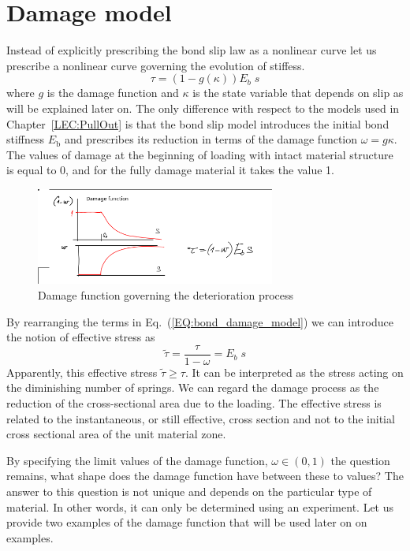\documentclass[main.tex]{subfiles}
\begin{document}
\section{Damage model}
\label{SEC:BondDamageModel}

Instead of explicitly prescribing the bond slip law as a nonlinear curve let us prescribe 
a nonlinear curve governing the evolution of stiffess.
\begin{equation}
\label{EQ:bond_damage_model}
\tau = (1 - g(\kappa))E_b \; s
\end{equation}
where $g$ is the damage function and $\kappa$ is the state variable
that depends on slip as will be explained later on. The only difference with respect to the models
used in Chapter~\ref{LEC:PullOut} is that the bond slip model introduces the 
initial bond stiffness $E_\mathrm{b}$ and prescribes its reduction in terms of the 
damage function $\omega = g{\kappa}$. The values of damage at the beginning of loading with 
intact material structure is equal to 0, and for the fully damage material it takes the value 1.
\begin{figure}[ht]
	\centering
  \includegraphics[width=0.7\textwidth]{drawings/damage_function.png}
	\caption{Damage function governing the deterioration process}
	\label{FIGSourcesOfDamageFunction}
\end{figure}
By rearranging the terms in Eq.~(\ref{EQ:bond_damage_model}) we can introduce the notion of effective stress
as 
\begin{equation}
\tilde{\tau} = \frac{\tau}{1-\omega} = E_b \; s
\end{equation}
Apparently, this effective stress $\tilde{\tau} \geq \tau$. It can be interpreted as the stress acting on the diminishing number of springs. We can regard the damage process as the reduction of the cross-sectional area
due to the loading. The effective stress is related to the instantaneous, or still effective, cross section and not to
the initial cross sectional area of the unit material zone.

By specifying the limit values of the damage function, $\omega \in (0,1)$ the question remains, 
what shape does the damage function have between these to values? The answer to this question is not unique
and depends on the particular type of material. In other words, it can only be determined using an experiment.
Let us provide two examples of the damage function that will be used later on on examples.
\end{document}
